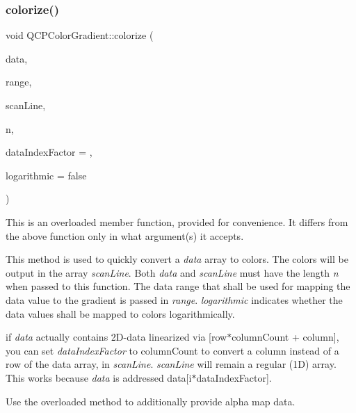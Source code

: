 \mbox{\label{class_q_c_p_color_gradient_aaf423ceb943e177b0ed2c48c811d83dc}} 
\subsubsection{\texorpdfstring{colorize()}{colorize()}\hspace{0.1cm}{\footnotesize\ttfamily [1/2]}}
{\footnotesize\ttfamily void Q\+C\+P\+Color\+Gradient\+::colorize (\begin{DoxyParamCaption}\item[{const double $\ast$}]{data,  }\item[{const \hyperlink{class_q_c_p_range}{Q\+C\+P\+Range} \&}]{range,  }\item[{Q\+Rgb $\ast$}]{scan\+Line,  }\item[{int}]{n,  }\item[{int}]{data\+Index\+Factor = {},  }\item[{bool}]{logarithmic = {\ttfamily false} }\end{DoxyParamCaption})}

This is an overloaded member function, provided for convenience. It differs from the above function only in what argument(s) it accepts.

This method is used to quickly convert a {\itshape data} array to colors. The colors will be output in the array {\itshape scan\+Line}. Both {\itshape data} and {\itshape scan\+Line} must have the length {\itshape n} when passed to this function. The data range that shall be used for mapping the data value to the gradient is passed in {\itshape range}. {\itshape logarithmic} indicates whether the data values shall be mapped to colors logarithmically.

if {\itshape data} actually contains 2\+D-\/data linearized via {\ttfamily \mbox{[}row$\ast$column\+Count + column\mbox{]}}, you can set {\itshape data\+Index\+Factor} to {\ttfamily column\+Count} to convert a column instead of a row of the data array, in {\itshape scan\+Line}. {\itshape scan\+Line} will remain a regular (1D) array. This works because {\itshape data} is addressed {\ttfamily data\mbox{[}i$\ast$data\+Index\+Factor\mbox{]}}.

Use the overloaded method to additionally provide alpha map data.

